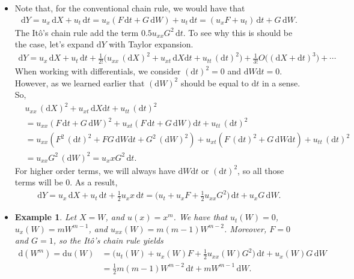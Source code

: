 \documentclass[10pt]{article}
\newtheorem{example}[lemma]{Example}
\newcommand{\dee}{\mathrm{d}}
\begin{document}
\begin{itemize}
  \item Note that, for the conventional chain rule, we would have that
  \begin{align*}
    \dee Y = u_x\, \dee X + u_t\, \dee t 
    = u_x (F\, \dee t + G\, \dee W) + u_t\, \dee t
    = (u_x F + u_t)\, \dee t + G\, \dee W.
  \end{align*}
  The It\^{o}'s chain rule add the term $0.5 u_{xx} G^2\, \dee t$. To see why this is should be the case, let's expand $\dee Y$ with Taylor expansion.
  \begin{align*}
    \dee Y = u_x\, \dee X + u_t\, \dee t + \frac{1}{2!} \big(u_{xx}\, (\dee X)^2 + u_{xt}\, \dee X \dee t + u_{tt}\, (\dee t)^2 \big) + \frac{1}{3!} O\big((\dee X + \dee t)^3\big) + \dotsb
  \end{align*}
  When working with differentials, we consider $(\dee t)^2 = 0$ and $\dee W \dee t = 0$. However, as we learned earlier that $(\dee W)^2$ should be equal to $\dee t$ in a sense. So,
  \begin{align*}
    &u_{xx}\, (\dee X)^2 + u_{xt}\, \dee X \dee t + u_{tt}\, (\dee t)^2 \\
    &= u_{xx} (F\,\dee t + G\,\dee W)^2 + u_{xt}(F\,\dee t + G\, \dee W)\dee t + u_{tt}\, (\dee t)^2 \\
    &= u_{xx} (F^2\, (\dee t)^2 + FG\, \dee W \dee t + G^2\, (\dee W)^2) + u_{xt}(F\,(\dee t)^2 + G\, \dee W\dee t) + u_{tt}\,(\dee t)^2 \\
    &= u_{xx}G^2\, (\dee W)^2 = u_xxG^2\, \dee t.
  \end{align*}
  For higher order terms, we will always have $\dee W \dee t$ or $(\dee t)^2$, so all those terms will be $0$. As a result,
  \begin{align*}
    \dee Y 
    = u_x\, \dee X + u_t\, \dee t + \frac{1}{2} u_xx\, \dee t
    = \bigg(u_t + u_x F + \frac{1}{2}u_{xx} G^2\bigg)\, \dee t + u_x G\, \dee W.
  \end{align*}

  \item \begin{example}
    Let $X = W$, and $u(x) = x^m$. We have that $u_t(W) = 0$, $u_x(W) = mW^{m-1}$, and $u_{xx}(W) = m(m-1)W^{m-2}$. Moreover, $F = 0$ and $G = 1$, so the It\^{o}'s chain rule yields
    \begin{align*}
      \dee(W^m) 
      = \dee u(W)
      &= \bigg(u_t(W) + u_x(W) F + \frac{1}{2}u_{xx}(W) G^2\bigg)\, \dee t + u_x(W) G\, \dee W \\
      &= \frac{1}{2} m(m-1) W^{m-2}\, \dee t + mW^{m-1}\, \dee W.
    \end{align*}
  \end{example}


\end{itemize}
\end{document}

